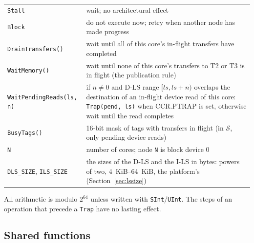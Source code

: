 \begin{center}
\begin{tabularx}{\linewidth}{@{}l X@{}}
\texttt{Stall} & wait; no architectural effect\\
\texttt{Block} & do not execute now; retry when another node has made progress\\
\texttt{DrainTransfers()} & wait until all of this core's in-flight transfers have completed\\
\texttt{WaitMemory()} & wait until none of this core's transfers to T2 or T3 is in flight (the publication rule)\\
\texttt{WaitPendingReads(ls, n)} & if $n \neq 0$ and D-LS range $[\textit{ls}, \textit{ls}+n)$ overlaps the destination of an in-flight device read of this core: \texttt{Trap(pend, ls)} when CCR.PTRAP is set, otherwise wait until the read completes\\
\texttt{BusyTags()} & 16-bit mask of tags with transfers in flight (in $\mathcal{S}$, only pending device reads)\\
\texttt{N} & number of cores; node \texttt{N} is block device 0\\
\texttt{DLS\_SIZE}, \texttt{ILS\_SIZE} & the sizes of the D-LS and the I-LS in bytes: powers of two, 4~KiB--64~KiB, the platform's (Section~\ref{sec:lssize})\\
\bottomrule
\end{tabularx}
\end{center}

All arithmetic is modulo $2^{64}$ unless written with \texttt{SInt}/\texttt{UInt}. The steps of an
operation that precede a \texttt{Trap} have no lasting effect.

\subsection{Shared functions}

